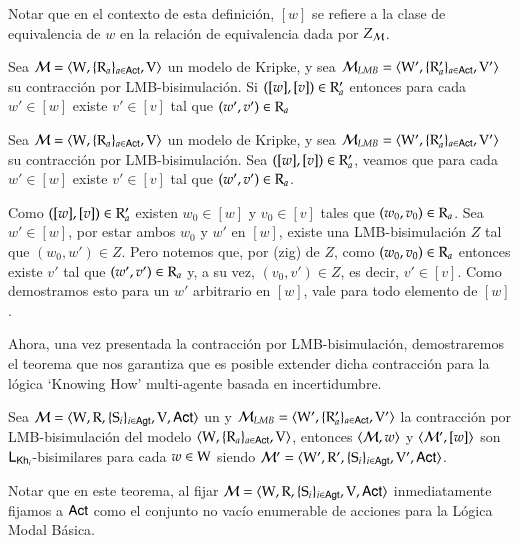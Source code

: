 Notar que en el contexto de esta definición, $[w]$ se refiere a la clase de equivalencia de $w$ en la relación de equivalencia dada por $Z_{\mathcal{M}}$. 

\begin{lema}
    Sea $\mathcal{M} = \langle \mathrm{W},\{\mathrm{R}_a\}_{a\in{\rm \sf Act}},\mathrm{V} \rangle$ un modelo de Kripke, y sea $\mathcal{M}_{LMB} = \langle \mathrm{W}',\{\mathrm{R}_a'\}_{a\in{\rm \sf Act}},\mathrm{V}' \rangle$ su contracción por LMB-bisimulación.
    Si $([w],[v]) \in \mathrm{R}'_a$ entonces para cada $w' \in [w]$ existe $v' \in [v]$ tal que $(w',v') \in \mathrm{R}_a$
\end{lema}

\begin{demostracion}
    Sea $\mathcal{M} = \langle \mathrm{W},\{\mathrm{R}_a\}_{a\in{\rm \sf Act}},\mathrm{V} \rangle$ un modelo de Kripke, y sea $\mathcal{M}_{LMB} = \langle \mathrm{W}',\{\mathrm{R}_a'\}_{a\in{\rm \sf Act}},\mathrm{V}' \rangle$ su contracción por LMB-bisimulación. Sea $([w],[v]) \in \mathrm{R}'_a$, veamos que para cada $w' \in [w]$ existe $v' \in [v]$ tal que $(w',v') \in \mathrm{R}_a$.

    Como $([w],[v]) \in \mathrm{R}'_a$ existen $w_0 \in [w]$ y $v_0 \in [v]$ tales que $(w_0,v_0)\in \mathrm{R}_a$. Sea $w' \in [w]$, por estar ambos 
    $w_0$ y $w'$ en $[w]$, existe una LMB-bisimulación $Z$ tal que $(w_0,w') \in Z$. Pero notemos que, por (zig) de $Z$, como 
    $(w_0,v_0) \in \mathrm{R}_a$  entonces existe $v'$ tal que $(w',v') \in \mathrm{R}_a$ y, a su vez, 
    $(v_0,v') \in Z$, es decir, $v' \in [v]$. Como demostramos esto para un $w'$ arbitrario en $[w]$, vale para todo elemento de $[w]$.
\end{demostracion}

Ahora, una vez presentada la contracción por LMB-bisimulación, demostraremos el teorema que nos garantiza que es posible extender dicha contracción para 
la lógica `Knowing How' multi-agente basada en incertidumbre.

\begin{teorema}
    Sea $\mathcal{M}=\langle \mathrm{W},\mathrm{R},\{ \mathrm{S}_i \}_{i \in {\rm \sf Agt}},\mathrm{V},{\rm \sf Act} \rangle$ un \ults y $\mathcal{M}_{LMB} = \langle \mathrm{W}',\{\mathrm{R}_a'\}_{a\in{\rm \sf Act}},\mathrm{V}' \rangle$ 
    la contracción por LMB-bisimulación del modelo $\langle \mathrm{W},\{\mathrm{R}_a\}_{a\in{\rm \sf Act}},\mathrm{V} \rangle$, entonces $\langle \mathcal{M},w \rangle$ y $\langle \mathcal{M}',[w] \rangle$ 
    son $\mathsf{L}_{\mathsf{Kh}_i}$-bisimilares para cada $w \in \mathrm{W}$ siendo $\mathcal{M}' = \langle \mathrm{W}',\mathrm{R}',\{ \mathrm{S}_i \}_{i \in {\rm \sf Agt}},\mathrm{V}',{\rm \sf Act} \rangle$.
\end{teorema}

Notar que en este teorema, al fijar $\mathcal{M}=\langle \mathrm{W},\mathrm{R},\{ \mathrm{S}_i \}_{i \in {\rm \sf Agt}},\mathrm{V},{\rm \sf Act} \rangle$ inmediatamente fijamos a ${\rm \sf Act}$ como el conjunto no vacío enumerable de acciones para la Lógica Modal Básica.

